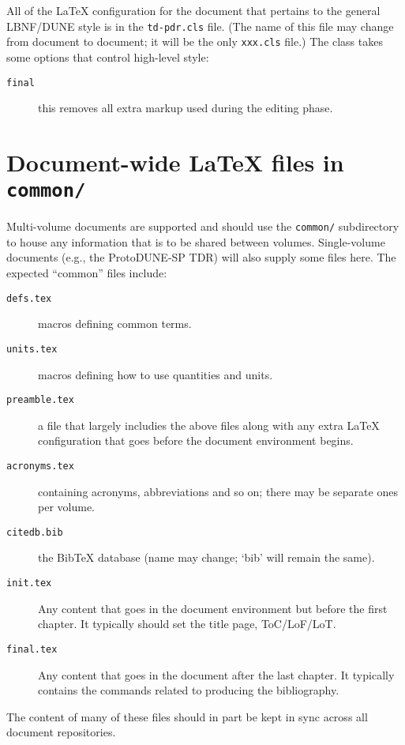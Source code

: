 All of the \LaTeX{} configuration for the document that pertains to
the general LBNF/DUNE style is in the
\texttt{td-pdr.cls} file. (The name of this file may change from document to document; it will be the only \texttt{xxx.cls} file.)
The class takes some options that control high-level style:

\begin{description}
\item[\texttt{final}] this removes all extra markup used during the
  editing phase.
\end{description}


\section{Document-wide \LaTeX{} files in \texttt{common/}}

Multi-volume documents are supported and should use the
\texttt{common/} subdirectory to house any information that is to be
shared between volumes.
Single-volume documents (e.g., the ProtoDUNE-SP TDR) will also supply some files here.
The expected ``common'' files include:
\begin{description}
\item[\texttt{defs.tex}] macros defining common terms.
\item[\texttt{units.tex}] macros defining how to use quantities and units.
\item[\texttt{preamble.tex}] a file that largely includies the above files along with
  any extra \LaTeX{} configuration that goes before the document
  environment begins.
\item[\texttt{acronyms.tex}] containing acronyms, abbreviations and so on; there may be separate ones per volume.
\item[\texttt{citedb.bib}] the BibTeX database (name may change; `bib' will remain the same).
\item[\texttt{init.tex}] Any content that goes in the document
  environment but before the first chapter.
  It typically should set the title page, ToC/LoF/LoT.
\item[\texttt{final.tex}] Any content that goes in the document after
  the last chapter.
  It typically contains the commands related to producing the
  bibliography.
\end{description}

The content of many of these files should in part be kept in sync
across all document repositories.

